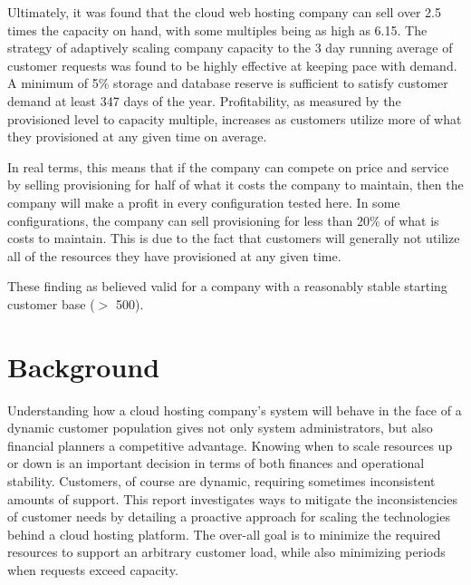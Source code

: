 \documentclass[12pt]{article} %
\begin{document}
Ultimately, it was found that the cloud web hosting company can sell over 2.5 times the capacity on hand, with some multiples being as high as 6.15.  
The strategy of adaptively scaling company capacity to the 3 day running average of customer requests was found to be highly effective at keeping pace with demand.  
A minimum of 5\% storage and database reserve is sufficient to satisfy customer demand at least 347 days of the year.
Profitability, as measured by the provisioned level to capacity multiple, increases as customers utilize more of what they provisioned at any given time on average.

In real terms, this means that if the company can compete on price and service by selling provisioning for half of what it costs the company to maintain, then the company will make a profit in every configuration tested here.  In some configurations, the company can sell provisioning for less than 20\% of what is costs to maintain.  This is due to the fact that customers will generally not utilize all of the resources they have provisioned at any given time.

These finding as believed valid for a company with a reasonably stable starting customer base (\(>\) 500).
\newpage


\tableofcontents %

\newpage %


\section{Background}
Understanding how a cloud hosting company's system will behave in the face of a dynamic customer population gives not only system administrators, but also financial planners a competitive advantage.
Knowing when to scale resources up or down is an important decision in terms of both finances and operational stability. 
Customers, of course are dynamic, requiring sometimes inconsistent amounts of support.  
This report investigates ways to mitigate the inconsistencies of customer needs by detailing a proactive approach for scaling the technologies behind a cloud hosting platform.
The over-all goal is to minimize the required resources to support an arbitrary customer load, while also minimizing periods when requests exceed capacity.
\end{document}
